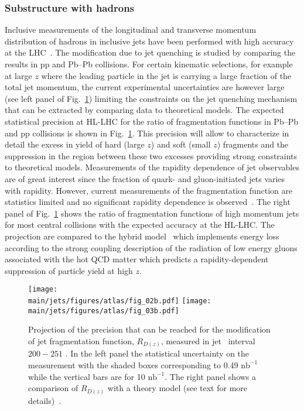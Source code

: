 \subsubsection{Substructure with hadrons}
Inclusive measurements of the longitudinal and transverse momentum distribution of hadrons in inclusive jets have been performed with high accuracy at the LHC~\cite{Aaboud:2018hpb,Sirunyan:2018jqr}. The modification due to jet quenching is studied by comparing the results in pp and Pb--Pb collisions.
For certain kinematic selections, for example at large $z$ where the leading particle in the jet is carrying a large fraction of the total jet momentum, the current experimental uncertainties are however large (see left panel of Fig.~\ref{fig:jetDz}) limiting the constraints on the jet quenching mechanism that can be extracted by comparing data to theoretical models. The expected statistical precision at HL-LHC for the ratio of fragmentation functions in Pb--Pb and pp collisions is shown in Fig.~\ref{fig:jetDz}. This precision will allow to characterize in detail the excess in yield of hard (large $z$) and soft (small $z$) fragments and the suppression in the region between these two excesses providing strong constraints to theoretical models. Measurements of the rapidity dependence of jet observables are of great interest since the fraction of quark- and gluon-initiated jets varies with rapidity. However, current measurements of the fragmentation function are statistics limited and no significant rapidity dependence is observed~\cite{Aaboud:2018hpb}. The right panel of Fig.~\ref{fig:jetDz} shows the ratio of fragmentation functions of high momentum jets for most central collisions with the expected accuracy at the HL-LHC. The projection are compared to the hybrid model~\cite{Casalderrey-Solana:2014bpa,Hulcher:2017cpt} which implements energy loss according to the strong coupling description of the radiation of low energy gluons associated with the hot QCD matter which predicts a rapidity-dependent suppression of particle yield at high $z$. 
\begin{figure}[!ht]
\begin{center}
\texttt{[image: \\main/jets/figures/atlas/fig\_02b.pdf]}
\texttt{[image: \\main/jets/figures/atlas/fig\_03b.pdf]}
\caption{Projection of the precision that can be reached for the modification of jet fragmentation function, $R_{D(z)}$, measured in jet \pT\ interval $200-251$ \gevc. In the left panel the statistical uncertainty on the measurement with the shaded boxes corresponding to 0.49 $\mathrm{nb}^{-1}$ while the vertical bars are for 10 $\mathrm{nb}^{-1}$. The right panel shows a comparison of $R_{D(z)}$ with a theory model (see text for more details)~\cite{ATL-PHYS-PUB-2018-019}.}
\label{fig:jetDz}
\end{center}
\end{figure}


